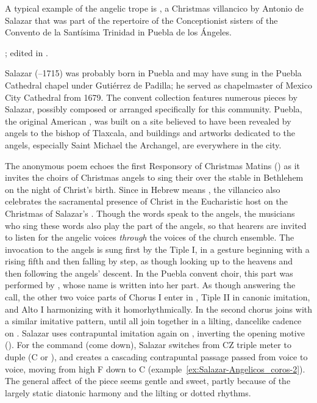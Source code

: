 A typical example of the angelic trope is , a Christmas villancico by Antonio de Salazar that was part of the
repertoire of the Conceptionist sisters of the Convento de la Santísima
Trinidad in Puebla de los Ángeles.%
\begin{Footnote} 
    ; edited in \autocite{Cashner:WLSCM32}.  
\end{Footnote}
Salazar (--1715) was probably born in Puebla and may have sung in
the Puebla Cathedral chapel under Gutiérrez de Padilla; he served as
chapelmaster of Mexico City Cathedral from 1679.%
    \Autocite{Koegel:Salazar} %
The convent collection features numerous pieces by Salazar, possibly composed
or arranged specifically for this community.%
    \citXXX[catalog]
Puebla, the original American , was built on a site
believed to have been revealed by angels to the bishop of Tlaxcala, and
buildings and artworks dedicated to the angels, especially Saint Michael the
Archangel, are everywhere in the city.

The anonymous poem echoes the first Responsory of Christmas Matins
() as it invites the choirs of Christmas
angels to sing their  over the stable in Bethlehem on the night
of Christ's birth.
Since  in Hebrew means , the
villancico also celebrates the sacramental presence of Christ in the
Eucharistic host on the Christmas of Salazar's .
Though the words speak to the angels, the musicians who sing these words also
play the part of the angels, so that hearers are invited to listen for the
angelic voices \emph{through} the voices of the church ensemble. 
The invocation to the angels is sung first by the Tiple I, in a gesture
beginning with a rising fifth and then falling by step, as though looking up to
the heavens and then following the angels' descent.
In the Puebla convent choir, this part was performed by ,
whose name is written into her part.
As though answering the call, the other two voice parts of Chorus I enter in
, Tiple II in canonic imitation, and Alto I harmonizing with it
homorhythmically. 
In  the second chorus joins with a similar imitative
pattern, until all join together in a lilting, dancelike cadence on
.
Salazar uses contrapuntal imitation again on ,
inverting the opening motive ().
For the command  (come down), Salazar switches from CZ
triple meter to duple (C or ), and creates a cascading
contrapuntal passage passed from voice to voice, moving from high F
down to C (example~\ref{ex:Salazar-Angelicos_coros-2}).
The general affect of the piece seems gentle and sweet, partly because of the
largely static diatonic harmony and the lilting or dotted rhythms.

